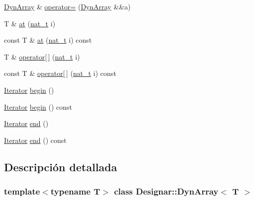 \begin{DoxyCompactItemize}
\item 
\hyperlink{class_designar_1_1_dyn_array}{Dyn\+Array} \& \hyperlink{class_designar_1_1_dyn_array_a80a5538e26254acd5d2449a8364918da}{operator=} (\hyperlink{class_designar_1_1_dyn_array}{Dyn\+Array} \&\&a)
\item 
T \& \hyperlink{class_designar_1_1_dyn_array_a117ba8cd3a9275b36d713a0ef3aef0e3}{at} (\hyperlink{namespace_designar_aa72662848b9f4815e7bf31a7cf3e33d1}{nat\+\_\+t} i)
\item 
const T \& \hyperlink{class_designar_1_1_dyn_array_a0bb20c2467a91bad1577fae7bed15828}{at} (\hyperlink{namespace_designar_aa72662848b9f4815e7bf31a7cf3e33d1}{nat\+\_\+t} i) const
\item 
T \& \hyperlink{class_designar_1_1_dyn_array_ac24a3b500af13093ade4978739e2d6e3}{operator\mbox{[}$\,$\mbox{]}} (\hyperlink{namespace_designar_aa72662848b9f4815e7bf31a7cf3e33d1}{nat\+\_\+t} i)
\item 
const T \& \hyperlink{class_designar_1_1_dyn_array_af329e06efe69cb53e9d1a44a1ed0beeb}{operator\mbox{[}$\,$\mbox{]}} (\hyperlink{namespace_designar_aa72662848b9f4815e7bf31a7cf3e33d1}{nat\+\_\+t} i) const
\item 
\hyperlink{class_designar_1_1_dyn_array_1_1_iterator}{Iterator} \hyperlink{class_designar_1_1_dyn_array_aa8032abbe4db89827ac88aa1ea932712}{begin} ()
\item 
\hyperlink{class_designar_1_1_dyn_array_1_1_iterator}{Iterator} \hyperlink{class_designar_1_1_dyn_array_a36886c618a763286ec179f7fc7cffa68}{begin} () const
\item 
\hyperlink{class_designar_1_1_dyn_array_1_1_iterator}{Iterator} \hyperlink{class_designar_1_1_dyn_array_a1a6bfcf9c4cd8d54138339b9313661f3}{end} ()
\item 
\hyperlink{class_designar_1_1_dyn_array_1_1_iterator}{Iterator} \hyperlink{class_designar_1_1_dyn_array_ab2ff81ff5bfeefbcd0a302da9effff89}{end} () const
\end{DoxyCompactItemize}


\subsection{Descripción detallada}
\subsubsection*{template$<$typename T$>$\newline
class Designar\+::\+Dyn\+Array$<$ T $>$}



